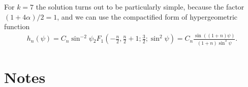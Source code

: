\documentclass[
a4paper,%
10pt,%
titlepage,%
twoside%
]{article}
\begin{document}
For $k=7$ the solution turns out to be particularly simple, because the
factor $(1+4\alpha)/2=1$, and we can use the compactified form of
hypergeometric function
\begin{gather}
  h_n(\psi)=C_n\sin^{-2}\psi
  {}_2F_1(-\frac{n}{2},\frac{n}{2}+1;\frac{3}{2};\sin^2\psi)
  =C_n\frac{\sin((1+n)\psi)}{(1+n)\sin^3\psi}.
\end{gather}




\section{Notes}
\label{sec:Notes}
\end{document}
